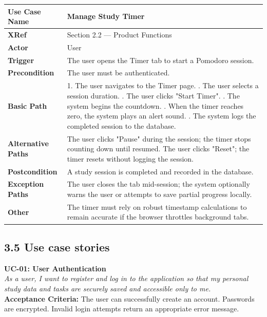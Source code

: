 \documentclass[12pt]{article}
\begin{document}
\renewcommand{\arraystretch}{1.5}
\begin{xltabular}{\textwidth}{|p{4cm}|X|}
\hline
\textbf{Use Case Name} & \textbf{Manage Study Timer} \\ \hline
\textbf{XRef} & Section 2.2 — Product Functions \\ \hline
\textbf{Actor} & User \\ \hline
\textbf{Trigger} & The user opens the Timer tab to start a Pomodoro session. \\ \hline
\textbf{Precondition} & The user must be authenticated. \\ \hline
\textbf{Basic Path} & 1. The user navigates to the Timer page. . The user selects a session duration. . The user clicks "Start Timer". . The system begins the countdown. . When the timer reaches zero, the system plays an alert sound. . The system logs the completed session to the database. \\ \hline
\textbf{Alternative Paths} & The user clicks "Pause" during the session; the timer stops counting down until resumed. The user clicks "Reset"; the timer resets without logging the session. \\ \hline
\textbf{Postcondition} & A study session is completed and recorded in the database. \\ \hline
\textbf{Exception Paths} & The user closes the tab mid-session; the system optionally warns the user or attempts to save partial progress locally. \\ \hline
\textbf{Other} & The timer must rely on robust timestamp calculations to remain accurate if the browser throttles background tabs. \\ \hline
\end{xltabular}

\subsection*{3.5 Use case stories}
\noindent\textbf{UC-01: User Authentication} \\
\textit{As a user, I want to register and log in to the application so that my personal study data and tasks are securely saved and accessible only to me.} \\
\textbf{Acceptance Criteria:} The user can successfully create an account. Passwords are encrypted. Invalid login attempts return an appropriate error message.
\end{document}
